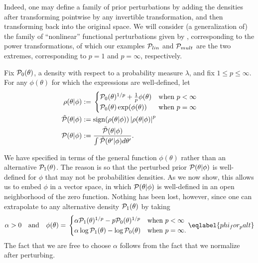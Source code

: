 Indeed, one may define a family of prior perturbations by adding the densities
after transforming pointwise by any invertible transformation, and then
transforming back into the original space.  We will consider (a generalization
of) the family of ``nonlinear'' functional perturbations given by
\citep{gustafson:1996:local}, corresponding to the power transformations, of
which our examples $\mathcal{P}_{lin}$ and $\mathcal{P}_{mult}$ are the two extremes,
corresponding to $p=1$ and $p=\infty$, respectively.

\begin{defn}
%
Fix $\mathcal{P}_{0}(\theta)$, a density with respect to a probability measure $\lambda$,
and fix $1 \le p \le \infty$.  For any $\phi(\theta)$ for which the expressions
are well-defined, let
%
\begin{align*}
%
\rho(\theta \vert \phi) :={}& \begin{cases}
%
\pbase(\theta)^{1/p} + \frac{1}{p}\phi(\theta)
    & \textrm{when }p < \infty \\
\pbase(\theta)\exp(\phi(\theta))
    & \textrm{when }p = \infty
%
\end{cases}\\
%
\tilde{\p}(\theta \vert \phi) :={}&
    \mathrm{sign}(\rho(\theta \vert \phi)) \abs{\rho(\theta \vert \phi)}^p\\
\p(\theta \vert \phi) :={}&
    \frac{\tilde{\p}(\theta \vert \phi)}
         {\int \tilde{\p}(\theta' \vert \phi) d\theta'}.
%
\end{align*}
%
\end{defn}
%

We have specified  in terms of the general function
$\phi(\theta)$ rather than an alternative $\mathcal{P}_{1}(\theta)$.  The reason is so
that the perturbed prior $\mathcal{P}(\theta \vert \phi)$ is well-defined for $\phi$ that
may not be probabilities densities.  As we now show, this allows us to embed
$\phi$ in a vector space, in which $\mathcal{P}(\theta \vert \phi)$ is well-defined in an
open neighborhood of the zero function.  Nothing has been lost, however, since
one can extrapolate to any alternative density $\mathcal{P}_{1}(\theta)$ by taking
%
\begin{align}
%
\alpha  >{} 0 \mathand
\phi(\theta) ={}
\begin{cases}
\alpha \palt(\theta)^{1/p} - p \pbase(\theta)^{1/p}
    & \textrm{when }p < \infty \\
\alpha \log \palt(\theta) - \log \pbase(\theta)
    & \textrm{when }p = \infty.
\end{cases} \eqlabel{phi_for_palt}
%
\end{align}
%
The fact that we are free to choose $\alpha$ follows from the fact that we
normalize after perturbing.


